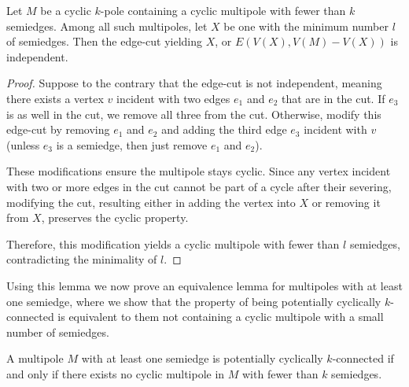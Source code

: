 \documentclass[12pt, twoside]{book}
\begin{document}
\begin{lemma}\label{lem:smallest-cut-in-mpoles-is-independent}
	Let $M$ be a cyclic $k$-pole containing a cyclic multipole with fewer than $k$ semiedges. Among all such multipoles, let $X$ be one with the minimum number $l$ of semiedges. Then the edge-cut yielding $X$, or $E\left(V(X), V(M)-V(X)\right)$ is independent.
\end{lemma}

\begin{proof}
	Suppose to the contrary that the edge-cut is not independent, meaning there exists a vertex $v$ incident with two edges $e_1$ and $e_2$ that are in the cut. If $e_3$ is as well in the cut, we remove all three from the cut. Otherwise, modify this edge-cut by removing $e_1$ and $e_2$ and adding the third edge $e_3$ incident with $v$ (unless $e_3$ is a semiedge, then just remove $e_1$ and $e_2$).
	
	These modifications ensure the multipole stays cyclic. Since any vertex incident with two or more edges in the cut cannot be part of a cycle after their severing, modifying the cut, resulting either in adding the vertex into $X$ or removing it from $X$, preserves the cyclic property.
	
	Therefore, this modification yields a cyclic multipole with fewer than $l$ semiedges, contradicting the minimality of $l$.
\end{proof}

Using this lemma we now prove an equivalence lemma for multipoles with at least one semiedge, where we show that the property of being potentially cyclically \mbox{$k$-connected} is equivalent to them not containing a cyclic multipole with a small number of semiedges.

\begin{lemma}
	A multipole $M$ with at least one semiedge is potentially cyclically $k$-connected if and only if there exists no cyclic multipole in $M$ with fewer than $k$ semiedges.
\end{lemma}
\end{document}
